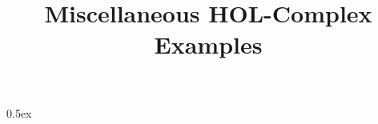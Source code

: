 \documentclass[11pt,a4paper]{article}
\begin{document}
\title{Miscellaneous HOL-Complex Examples}
\maketitle

\tableofcontents

\parindent 0pt\parskip 0.5ex

\end{document}
